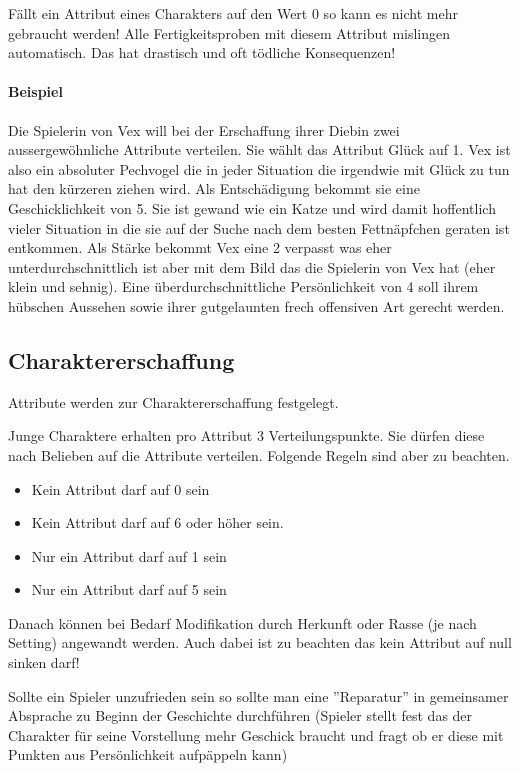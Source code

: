 \documentclass{article}
\begin{document}
Fällt ein Attribut eines Charakters auf den Wert 0 so kann es nicht mehr gebraucht werden! Alle Fertigkeitsproben
mit diesem Attribut mislingen automatisch. Das hat drastisch und oft tödliche Konsequenzen!

\paragraph{Beispiel}

Die Spielerin von Vex will bei der Erschaffung ihrer Diebin zwei aussergewöhnliche Attribute verteilen. Sie wählt das
Attribut Glück auf 1. Vex ist also ein absoluter Pechvogel die in jeder Situation die irgendwie mit Glück zu tun hat
den kürzeren ziehen wird. Als Entschädigung bekommt sie eine Geschicklichkeit von 5. Sie ist gewand wie ein Katze und
wird damit hoffentlich vieler Situation in die sie auf der Suche nach dem besten Fettnäpfchen geraten ist entkommen.
Als Stärke bekommt Vex eine 2 verpasst was eher unterdurchschnittlich ist aber mit dem Bild das die Spielerin von Vex
hat (eher klein und sehnig). Eine überdurchschnittliche Persönlichkeit von 4 soll ihrem hübschen Aussehen sowie ihrer
gutgelaunten frech offensiven Art gerecht werden.

\begin{center}
\subsection{Charaktererschaffung}
\end{center}

Attribute werden zur Charaktererschaffung festgelegt.

Junge Charaktere erhalten pro Attribut 3 Verteilungspunkte. Sie dürfen diese
nach Belieben auf die Attribute verteilen. Folgende Regeln sind aber zu beachten.

\begin{itemize}
\item Kein Attribut darf auf 0 sein
\item Kein Attribut darf auf 6 oder höher sein.
\item Nur ein Attribut darf auf 1 sein
\item Nur ein Attribut darf auf 5 sein
\end{itemize}

Danach können bei Bedarf Modifikation durch Herkunft oder Rasse (je nach Setting) angewandt werden. Auch dabei ist zu
beachten das kein Attribut auf null sinken darf!

Sollte ein Spieler unzufrieden sein so sollte man eine ''Reparatur'' in gemeinsamer Absprache zu Beginn der Geschichte
durchführen (Spieler stellt fest das der Charakter für seine Vorstellung mehr Geschick braucht und fragt ob er diese
mit Punkten aus Persönlichkeit aufpäppeln kann)
\end{document}
